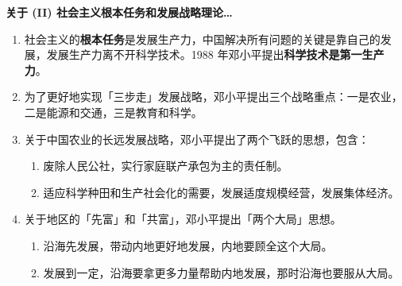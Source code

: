 \documentclass[UTF8]{ctexart}
\newcommand\Emph[2]{\colorbox{c#1-light}{\textcolor{c#1-emph}{\textbf{#2}}}}
\begin{document}
\begin{mybox}{6}
\textbf{关于 (II) 社会主义根本任务和发展战略理论…}
\begin{enumerate}[start=14]
  \item 社会主义的\Emph{6}{根本任务}是发展生产力，中国解决所有问题的关键是靠自己的发展，发展生产力离不开科学技术。1988 年邓小平提出\Emph{6}{科学技术是第一生产力}。
  \item 为了更好地实现「三步走」发展战略，邓小平提出三个战略重点：一是农业，二是能源和交通，三是教育和科学。
  \item 关于中国农业的长远发展战略，邓小平提出了两个飞跃的思想，包含：
  \begin{enumerate}[label={\roman{enumii})}, start=1]
    \item 废除人民公社，实行家庭联产承包为主的责任制。
    \item 适应科学种田和生产社会化的需要，发展适度规模经营，发展集体经济。
  \end{enumerate}
  \item 关于地区的「先富」和「共富」，邓小平提出「两个大局」思想。
  \begin{enumerate}[label={\roman{enumii})}, start=1]
    \item 沿海先发展，带动内地更好地发展，内地要顾全这个大局。
    \item 发展到一定，沿海要拿更多力量帮助内地发展，那时沿海也要服从大局。
  \end{enumerate}
\end{enumerate}
\end{mybox}
\end{document}
